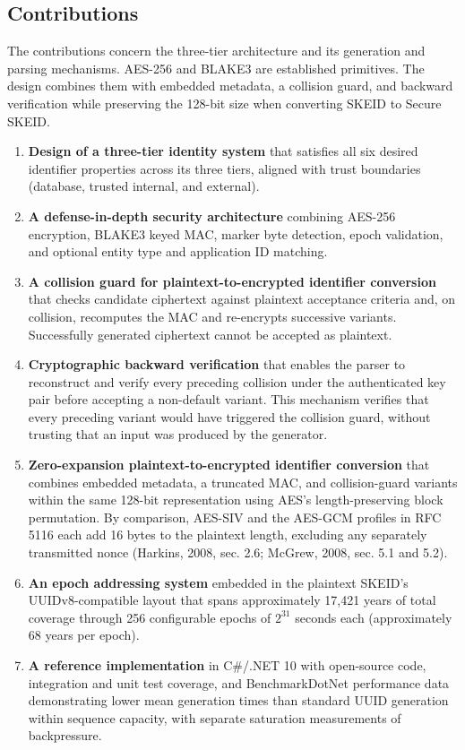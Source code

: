\documentclass[fleqn,10pt]{wlpeerj}
\providecommand{\tightlist}{%
  \setlength{\itemsep}{0pt}\setlength{\parskip}{0pt}}
\begin{document}
\newpage

\subsection{Contributions}\label{contributions}

The contributions concern the three-tier architecture and its generation
and parsing mechanisms. AES-256 and BLAKE3 are established primitives.
The design combines them with embedded metadata, a collision guard, and
backward verification while preserving the 128-bit size when converting
SKEID to Secure SKEID.

\begin{enumerate}
\def\labelenumi{\arabic{enumi}.}
\tightlist
\item
  \textbf{Design of a three-tier identity system} that satisfies all six
  desired identifier properties across its three tiers, aligned with
  trust boundaries (database, trusted internal, and external).
\item
  \textbf{A defense-in-depth security architecture} combining AES-256
  encryption, BLAKE3 keyed MAC, marker byte detection, epoch validation,
  and optional entity type and application ID matching.
\item
  \textbf{A collision guard for plaintext-to-encrypted identifier
  conversion} that checks candidate ciphertext against plaintext
  acceptance criteria and, on collision, recomputes the MAC and
  re-encrypts successive variants. Successfully generated ciphertext
  cannot be accepted as plaintext.
\item
  \textbf{Cryptographic backward verification} that enables the parser
  to reconstruct and verify every preceding collision under the
  authenticated key pair before accepting a non-default variant. This
  mechanism verifies that every preceding variant would have triggered
  the collision guard, without trusting that an input was produced by
  the generator.
\item
  \textbf{Zero-expansion plaintext-to-encrypted identifier conversion}
  that combines embedded metadata, a truncated MAC, and collision-guard
  variants within the same 128-bit representation using AES's
  length-preserving block permutation. By comparison, AES-SIV and the
  AES-GCM profiles in RFC 5116 each add 16 bytes to the plaintext
  length, excluding any separately transmitted nonce (Harkins, 2008,
  sec. 2.6; McGrew, 2008, sec. 5.1 and 5.2).
\item
  \textbf{An epoch addressing system} embedded in the plaintext SKEID's
  UUIDv8-compatible layout that spans approximately 17,421 years of
  total coverage through 256 configurable epochs of \(2^{31}\) seconds
  each (approximately 68 years per epoch).
\item
  \textbf{A reference implementation} in C\#/.NET 10 with open-source
  code, integration and unit test coverage, and BenchmarkDotNet
  performance data demonstrating lower mean generation times than
  standard UUID generation within sequence capacity, with separate
  saturation measurements of backpressure.
\end{enumerate}
\end{document}
